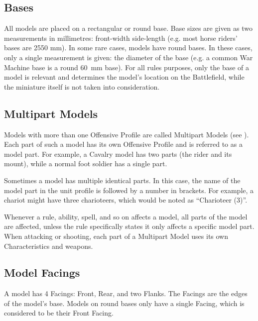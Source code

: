 \subsection{Bases}
\label{bases}

All models are placed on a rectangular or round base. Base sizes are given as two measurements in millimetres: front-width \timess{} side-length (e.g. most horse riders' bases are \num{25}\timess{}\num{50} \si{\milli\meter}). In some rare cases, models have round bases. In these cases, only a single measurement is given: the diameter of the base (e.g. a common War Machine base is a round \SI{60}{\milli\meter} base). For all rules purposes, only the base of a model is relevant and determines the model's location on the Battlefield, while the miniature itself is not taken into consideration.

\subsection{Multipart Models}
\label{multipart_models}

Models with more than one Offensive Profile are called Multipart Models (see ). Each part of such a model has its own Offensive Profile and is referred to as a model part. For example, a Cavalry model has two parts (the rider and its mount), while a normal foot soldier has a single part.

Sometimes a model has multiple identical parts. In this case, the name of the model part in the unit profile is followed by a number in brackets. For example, a chariot might have three charioteers, which would be noted as \enquote{Charioteer (3)}.

Whenever a rule, ability, spell, and so on affects a model, all parts of the model are affected, unless the rule specifically states it only affects a specific model part. When attacking or shooting, each part of a Multipart Model uses its own Characteristics and weapons.

\subsection{Model Facings}
\label{model_facings}

A model has 4 Facings: Front, Rear, and two Flanks. The Facings are the edges of the model's base. Models on round bases only have a single Facing, which is considered to be their Front Facing.


